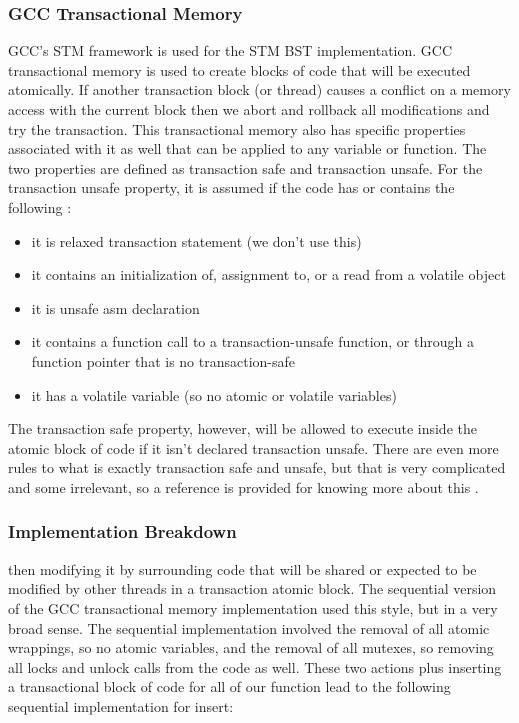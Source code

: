 \documentclass[conference]{IEEEtran}
\theoremstyle{definition}
\theoremstyle{theorem}
\begin{document}
\subsubsection{GCC Transactional Memory}
GCC's STM framework is used for the STM BST implementation. GCC transactional memory is used to create blocks of code that will be executed atomically. If another transaction block (or thread) causes a conflict on a memory access with the current block then we abort and rollback all modifications and try the transaction. This transactional memory also has specific properties associated with it as well that can be applied to any variable or function. The two properties are defined as transaction safe and transaction unsafe. For the transaction unsafe property, it is assumed if the code has or contains the following \cite{b4}:
\begin{itemize}
\item it is relaxed transaction statement (we don't use this)
\item it contains an initialization of, assignment to, or a read from a volatile object
\item it is unsafe asm declaration
\item it contains a function call to a transaction-unsafe function, or through a function pointer that is no transaction-safe
\item it has a volatile variable (so no atomic or volatile variables)
\end{itemize}

The transaction safe property, however, will be allowed to execute inside the atomic block of code if it isn't declared transaction unsafe. There are even more rules to what is exactly transaction safe and unsafe, but that is very complicated and some irrelevant, so a reference is provided for knowing more about this \cite{b4}. 

\subsubsection{Implementation Breakdown}

then modifying it by surrounding code that will be shared or expected to be modified by other threads in a transaction atomic block. The sequential version of the GCC transactional memory implementation used this style, but in a very broad sense. The sequential implementation involved the removal of all atomic wrappings, so no atomic variables, and the removal of all mutexes, so removing all locks and unlock calls from the code as well. These two actions plus inserting a transactional block of code for all of our function lead to the following sequential implementation for insert:
\end{document}
